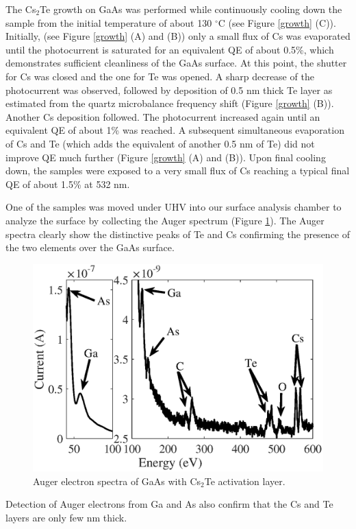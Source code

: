 The Cs$_2$Te growth on GaAs was performed while continuously cooling down the sample from the initial temperature of about 130 $^\circ$C (see Figure \ref{growth} (C)). 
Initially, (see Figure \ref{growth} (A) and (B)) only a small flux of Cs was evaporated until the photocurrent is saturated for an equivalent QE of about 0.5\%, which demonstrates sufficient cleanliness of the GaAs surface. At this point, the shutter for Cs was closed and the one for Te was opened. A sharp decrease of the photocurrent was observed, followed by deposition of 0.5 nm thick Te layer as estimated from the quartz microbalance frequency shift (Figure \ref{growth} (B)). Another Cs deposition followed. The photocurrent increased again until an equivalent QE of about 1\% was reached. A subsequent simultaneous evaporation of Cs and Te (which adds the equivalent of another 0.5 nm of Te) did not improve QE much further (Figure \ref{growth} (A) and (B)). Upon final cooling down, the samples were exposed to a very small flux of Cs reaching a typical final QE of about 1.5\% at 532 nm. %

One of the samples was moved under UHV into our surface analysis chamber to analyze the surface by collecting the Auger spectrum (Figure \ref{auger}). The Auger spectra clearly show the distinctive peaks of Te and Cs confirming the presence of the two elements over the GaAs surface.
\begin{figure}
    \centering
    \includegraphics[scale=0.53]{figs/CsTe/auger.eps}
    \caption{Auger electron spectra of GaAs with Cs$_2$Te activation layer.}
    \label{auger}
\end{figure}
Detection of Auger electrons from Ga and As also confirm that the Cs and Te layers are only few nm thick. 

